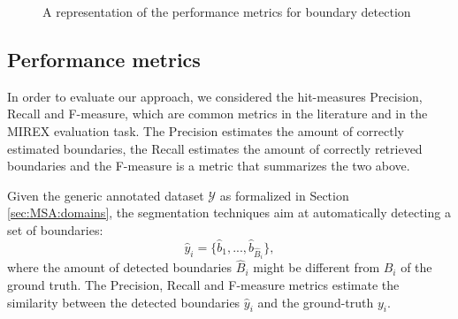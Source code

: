 \begin{figure}[t]
\centering
{} \hfil
{} \hfil
{} 
\caption{A representation of the performance metrics for boundary detection}
\label{fig:MSA:boundaries_metrics}
\end{figure}

 
\subsection{Performance metrics}
In order to evaluate our approach, we considered the hit-measures Precision, Recall and F-measure, which are common metrics  in the literature and in the MIREX evaluation task. The Precision estimates the amount of correctly estimated boundaries, the Recall estimates the amount of correctly retrieved boundaries and the F-measure is a metric that summarizes the two above.

Given the generic annotated dataset $\mathcal{Y}$ as formalized in Section \ref{sec:MSA:domains}, the segmentation techniques aim at automatically detecting a set of boundaries:
\begin{equation}
\hat{y}_i=\{\hat{b}_1,...,\hat{b}_{\hat{B}_i}\},
\end{equation}
where the amount of detected boundaries $\hat{B}_i$ might be different from $B_i$ of the ground truth. The Precision, Recall and F-measure metrics estimate the similarity between the detected boundaries $\hat{y}_i$ and the ground-truth $y_i$.

